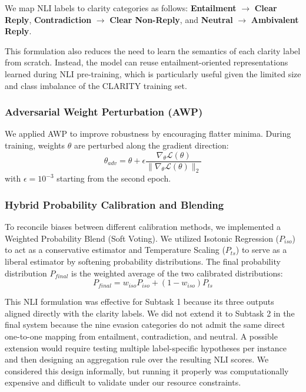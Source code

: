 \documentclass[11pt]{article}
\begin{document}
We map NLI labels to clarity categories as follows: \textbf{Entailment} $\rightarrow$ \textbf{Clear Reply}, \textbf{Contradiction} $\rightarrow$ \textbf{Clear Non-Reply}, and \textbf{Neutral} $\rightarrow$ \textbf{Ambivalent Reply}.

This formulation also reduces the need to learn the semantics of each clarity label from scratch. Instead, the model can reuse entailment-oriented representations learned during NLI pre-training, which is particularly useful given the limited size and class imbalance of the CLARITY training set.

\subsubsection{Adversarial Weight Perturbation (AWP)}
We applied AWP \citep{wu2020adversarial} to improve robustness by encouraging flatter minima. During training, weights $\theta$ are perturbed along the gradient direction:
\begin{equation*}
\theta_{adv} = \theta + \epsilon \frac{\nabla_\theta \mathcal{L}(\theta)}{\|\nabla_\theta \mathcal{L}(\theta)\|_2}
\end{equation*}
with $\epsilon = 10^{-3}$ starting from the second epoch.


\subsubsection{Hybrid Probability Calibration and Blending}
To reconcile biases between different calibration methods, we implemented a Weighted Probability Blend (Soft Voting). We utilized Isotonic Regression ($P_{iso}$) to act as a conservative estimator and Temperature Scaling ($P_{ts}$) to serve as a liberal estimator by softening probability distributions. The final probability distribution $P_{final}$ is the weighted average of the two calibrated distributions:
$$P_{final} = w_{iso} P_{iso} + (1 - w_{iso}) P_{ts}$$

This NLI formulation was effective for Subtask 1 because its three outputs aligned directly with the clarity labels. We did not extend it to Subtask 2 in the final system because the nine evasion categories do not admit the same direct one-to-one mapping from entailment, contradiction, and neutral. A possible extension would require testing multiple label-specific hypotheses per instance and then designing an aggregation rule over the resulting NLI scores. We considered this design informally, but running it properly was computationally expensive and difficult to validate under our resource constraints.
\end{document}

